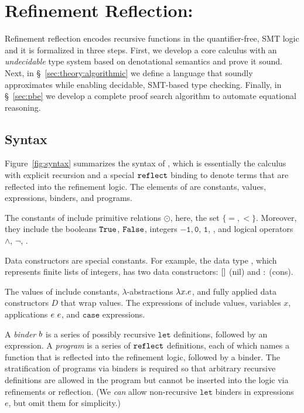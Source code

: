 \section{Refinement Reflection: \corelan}
\label{sec:formalism}
\label{sec:types-reflection}
\label{sec:theory}

Refinement reflection encodes recursive functions
in the quantifier-free, SMT logic and it is
formalized in three steps.
%
First, we develop a core calculus \corelan with an
\emph{undecidable} type system based on denotational
semantics and prove it sound. 
%
Next, in \S~\ref{sec:theory:algorithmic} we define
a language \smtlan that soundly approximates \corelan
while enabling decidable, SMT-based type checking.
%
Finally, in \S~\ref{sec:pbe} we develop a complete
proof search algorithm to automate equational reasoning.

\subsection{Syntax}

%
Figure~\ref{fig:syntax} summarizes the syntax of \corelan,
which is essentially the calculus \undeclang~\cite{Vazou14}
with explicit recursion and a special $\mathtt{reflect}$ binding
to denote terms that are reflected into the refinement logic.
%
The elements of \corelan are constants, values,
expressions, binders, and programs.

The constants of \corelan
include primitive relations $\odot$,
here, the set $\{ =, <\}$.
%
Moreover, they include the
booleans $\texttt{True}$, $\texttt{False}$,
integers $\mathtt{-1}, \mathtt{0}$, $\mathtt{1}$, \etc,
and logical operators $\mathtt{\land}$, $\mathtt{\lnot}$, \etc.

%
Data constructors are special constants.
For example, the data type \tintlist, which represents
finite lists of integers, has two data constructors: $[]$ (nil)
and $:$ (cons).

%
The values of \corelan include
constants, $\lambda$-abstractions
$\lambda x. e$, and fully
applied data constructors $D$
that wrap values.
%
The expressions of \corelan
include values, variables $x$,
applications $e \ e$, and
$\mathtt{case}$ expressions.

%
A \emph{binder} $b$ is a series of possibly recursive
$\mathtt{let}$ definitions, followed by an expression.
%
A \emph{program} \prog is a series of $\mathtt{reflect}$
definitions, each of which names a function
that is reflected into the refinement
logic, followed by a binder.
%
The stratification of programs via binders
is required so that arbitrary recursive definitions
are allowed in the program but cannot be inserted into the logic
via refinements or reflection.
%
(We \emph{can} allow non-recursive $\mathtt{let}$
binders in expressions $e$, but omit them for simplicity.)

